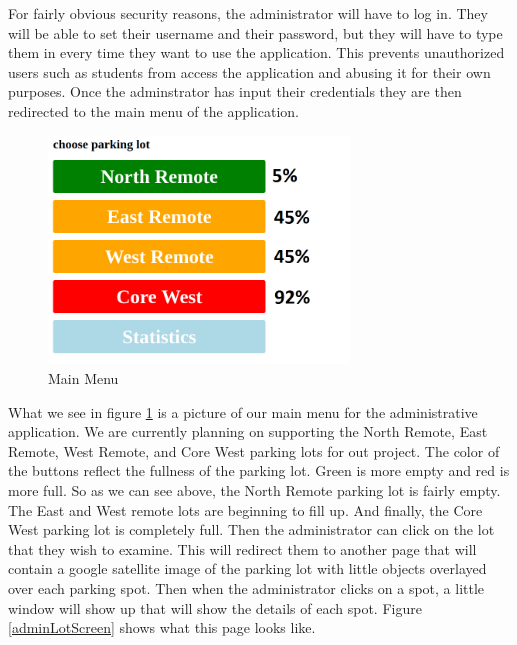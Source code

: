 \documentclass[paper=a4, fontsize=12pt]{scrartcl}
\numberwithin{equation}{section}		%
\numberwithin{figure}{section}			%
\numberwithin{table}{section}				%
\begin{document}
For fairly obvious security reasons, the administrator will have to log in. They will be able to set their username and their password, but they will have to type them in every time they want to use the application. This prevents unauthorized users such as students from access the application and abusing it for their own purposes. Once the adminstrator has input their credentials they are then redirected to the main menu of the application.


\begin{figure}[H]
\centering
\includegraphics[width=8cm]{adminAppPics/adminMainMenu.png}
\caption{Main Menu}
\label{adminMenu}
\end{figure}

What we see in figure \ref{adminMenu} is a picture of our main menu for the administrative application. We are currently planning on supporting the North Remote, East Remote, West Remote, and Core West parking lots for out project. The color of the buttons reflect the fullness of the parking lot. Green is more empty and red is more full. So as we can see above, the North Remote parking lot is fairly empty. The East and West remote lots are beginning to fill up. And finally, the Core West parking lot is completely full. Then the administrator can click on the lot that they wish to examine. This will redirect them to another page that will contain a google satellite image of the parking lot with little objects overlayed over each parking spot. Then when the administrator clicks on a spot, a little window will show up that will show the details of each spot. Figure \ref{adminLotScreen} shows what this page looks like.
\end{document}
